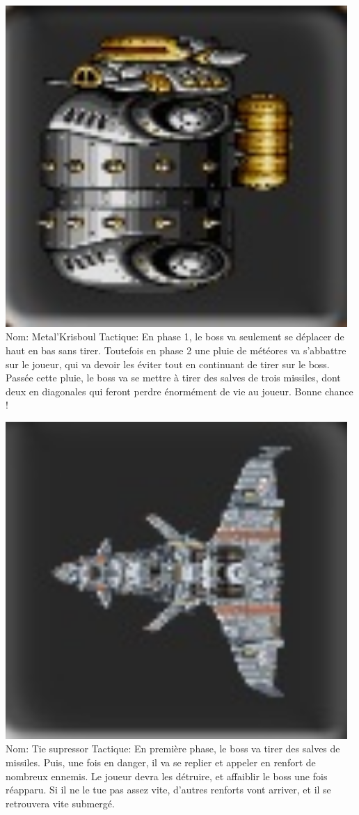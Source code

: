 \par \includegraphics[width=13cm]{images/boss2.jpg}   Nom: Metal'Krisboul
				Tactique: En phase 1, le boss va seulement se déplacer de haut en bas sans tirer. Toutefois en phase 2 une pluie de météores va s'abbattre sur le joueur, qui va devoir les éviter tout en continuant de tirer sur le boss. Passée cette pluie, le boss va se mettre à tirer des salves de trois missiles, dont deux en diagonales qui feront perdre énormément de vie au joueur. Bonne chance !
				
\par \includegraphics[width=13cm]{images/boss3.jpg} Nom: Tie supressor
				Tactique: En première phase, le boss va tirer des salves de missiles. Puis, une fois en danger, il va se replier et appeler en renfort de nombreux ennemis. Le joueur devra les détruire, et affaiblir le boss une fois réapparu. Si il ne le tue pas assez vite, d'autres renforts vont arriver, et il se retrouvera vite submergé.
				
